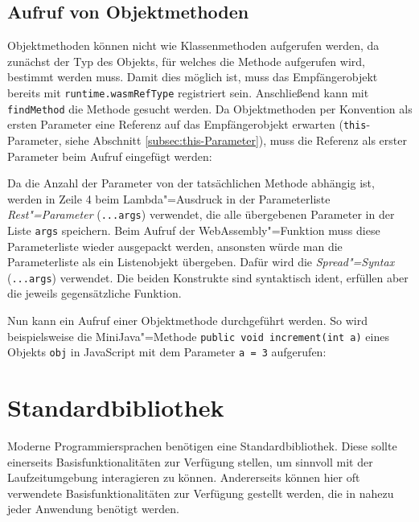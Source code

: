 \subsection{Aufruf von Objektmethoden}

Objektmethoden können nicht wie Klassenmethoden aufgerufen werden, da zunächst der Typ des Objekts, für welches die Methode aufgerufen wird, bestimmt werden muss. Damit dies möglich ist, muss das Empfängerobjekt bereits mit \lstinline{runtime.wasmRefType} registriert sein. Anschließend kann mit \lstinline{findMethod} die Methode gesucht werden. Da Objektmethoden per Konvention als ersten Parameter eine Referenz auf das Empfängerobjekt erwarten (\lstinline{this}-Parameter, siehe Abschnitt \ref{subsec:this-Parameter}), muss die Referenz als erster Parameter beim Aufruf eingefügt werden:



Da die Anzahl der Parameter von der tatsächlichen Methode abhängig ist, werden in Zeile 4 beim Lambda"=Ausdruck in der Parameterliste \emph{Rest"=Parameter} (\lstinline{...args}) \cite{MDNJavaScript} verwendet, die alle übergebenen Parameter in der Liste \lstinline{args} speichern. Beim Aufruf der WebAssembly"=Funktion muss diese Parameterliste wieder ausgepackt werden, ansonsten würde man die Parameterliste als ein Listenobjekt übergeben. Dafür wird die \emph{Spread"=Syntax} (\lstinline{...args}) verwendet. Die beiden Konstrukte sind syntaktisch ident, erfüllen aber die jeweils gegensätzliche Funktion.

Nun kann ein Aufruf einer Objektmethode durchgeführt werden. So wird beispielsweise die MiniJava"=Methode \lstinline{public void increment(int a)} eines Objekts \lstinline{obj} in JavaScript mit dem Parameter \lstinline{a = 3} aufgerufen:



\section{Standardbibliothek}
\label{sec:Standardbibliothek}

Moderne Programmiersprachen benötigen eine Standardbibliothek. Diese sollte einerseits Basisfunktionalitäten zur Verfügung stellen, um sinnvoll mit der Laufzeitumgebung interagieren zu können. Andererseits können hier oft verwendete Basisfunktionalitäten zur Verfügung gestellt werden, die in nahezu jeder Anwendung benötigt werden.

